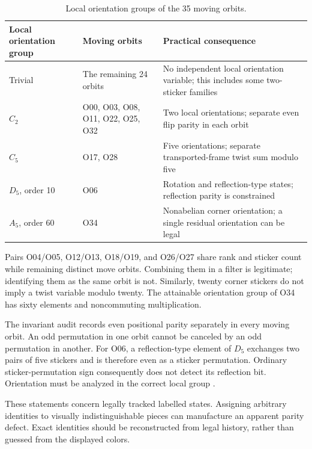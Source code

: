 \documentclass[a4paper,11pt]{article}
\begin{document}
\begin{table}[htbp]
\centering
\small
\caption{Local orientation groups of the 35 moving orbits.}
\label{tab:orientation-groups}
\begin{tabularx}{\linewidth}{@{}>{\raggedright\arraybackslash}p{.20\linewidth}>{\raggedright\arraybackslash}p{.28\linewidth}X@{}}
\toprule
\textbf{Local orientation group} & \textbf{Moving orbits} & \textbf{Practical consequence} \\
\midrule
Trivial & The remaining 24 orbits & No independent local orientation variable; this includes some two-sticker families \\
\(C_{2}\) & O00, O03, O08, O11, O22, O25, O32 & Two local orientations; separate even flip parity in each orbit \\
\(C_{5}\) & O17, O28 & Five orientations; separate transported-frame twist sum modulo five \\
\(D_{5}\), order 10 & O06 & Rotation and reflection-type states; reflection parity is constrained \\
\(A_{5}\), order 60 & O34 & Nonabelian corner orientation; a single residual orientation can be legal \\
\bottomrule
\end{tabularx}
\end{table}

Pairs O04/O05, O12/O13, O18/O19, and O26/O27 share rank and sticker count while remaining distinct move orbits. Combining them in a filter is legitimate; identifying them as the same orbit is not. Similarly, twenty corner stickers do not imply a twist variable modulo twenty. The attainable orientation group of O34 has sixty elements and noncommuting multiplication.

The invariant audit records even positional parity separately in every moving orbit. An odd permutation in one orbit cannot be canceled by an odd permutation in another. For O06, a reflection-type element of \(D_{5}\) exchanges two pairs of five stickers and is therefore even as a sticker permutation. Ordinary sticker-permutation sign consequently does not detect its reflection bit. Orientation must be analyzed in the correct local group \cite{transcript,algorithms}.

These statements concern legally tracked labelled states. Assigning arbitrary identities to visually indistinguishable pieces can manufacture an apparent parity defect. Exact identities should be reconstructed from legal history, rather than guessed from the displayed colors.
\end{document}
